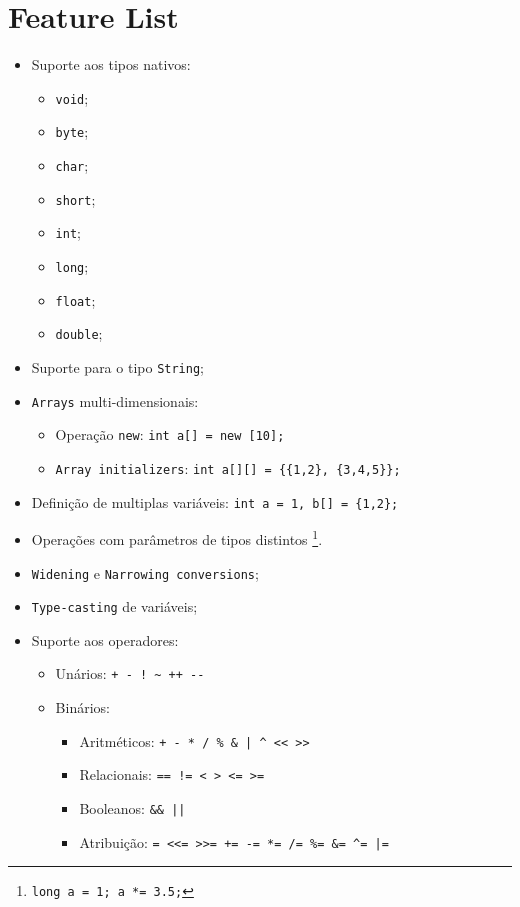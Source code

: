 \documentclass[a4paper]{article}
\begin{document}
\cleardoublepage
\section{Feature List}
\begin{itemize}
	\item Suporte aos tipos nativos:
	\begin{itemize}
		\item \texttt{void};
		\item \texttt{byte};
		\item \texttt{char};
		\item \texttt{short};
		\item \texttt{int};
		\item \texttt{long};
		\item \texttt{float};
		\item \texttt{double};
	\end{itemize}
	\item Suporte para o tipo \texttt{String};%
	\item \texttt{Arrays} multi-dimensionais:
	\begin{itemize}
		\item Operação \texttt{new}: \quad \texttt{int a[] = new [10];}
		\item \texttt{Array initializers}: \quad \texttt{int a[][] = \{\{1,2\}, \{3,4,5\}\}; }
	\end{itemize}
	\item Definição de multiplas variáveis: \quad \texttt{int a = 1, b[] = \{1,2\}; }
	\item Operações com parâmetros de tipos distintos \footnote[1]{\texttt{long a = 1; a *= 3.5;}}.
	\item \texttt{Widening} e \texttt{Narrowing conversions};
	\item \texttt{Type-casting} de variáveis;
	\item Suporte aos operadores:
	\begin{itemize}
		\item Unários: \quad \verb|+ - ! ~ ++ --|
		\item Binários:
		\begin{itemize}
			\item Aritméticos: \quad \verb!+ - * / % & | ^ << >>!
			\item Relacionais: \quad \verb|== != < > <= >=|
			\item Booleanos: \quad \verb!&& ||!
			\item Atribuição: \quad \verb!= <<= >>= += -= *= /= %= &= ^= |=!

\end{itemize}
\end{itemize}
\end{itemize}
\end{document}
